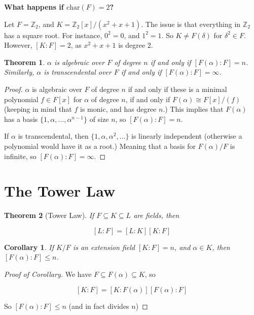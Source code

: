 \documentclass[12pt]{article}
\def\char{\text{char}}
\def\Z{{\mathbb Z}}
\newtheorem{theorem}{Theorem}
\newtheorem{corollary}{Corollary}
\theoremstyle{remark}
\theoremstyle{remark}
\theoremstyle{remark}
\theoremstyle{remark}
\theoremstyle{remark}
\begin{document}
{\bf What happens if $\char(F) = 2$?}

Let $F = \Z_2$, and $K = \Z_2[x] / (x^2 + x + 1)$. The issue is that everything
in $\Z_2$ has a square root. For instance, $0^2 = 0$, and $1^2 = 1$. So $K \ne
F(\delta)$ for $\delta^2 \in F$. However, $[K : F] = 2$, as $x^2 + x + 1$ is
degree $2$.

\begin{theorem}
  $\alpha$ is algebraic over $F$ of degree $n$ if and only if $[F(\alpha) : F] =
  n$. Similarly, $\alpha$ is transcendental over $F$ if and only if $[F(\alpha)
  : F] = \infty$.
\end{theorem}

\begin{proof}
  $\alpha$ is algebraic over $F$ of degree $n$ if and only if these is a minimal
  polynomial $f \in F[x]$ for $\alpha$ of degree $n$, if and only if $F(\alpha)
  \cong F[x] / (f)$ (keeping in mind that $f$ is monic, and has degree $n$.)
  This implies that $F(\alpha)$ has a basis $\{1, \alpha, \dots, \alpha^{n -
  1}\}$ of size $n$, so $[F(\alpha) : F] = n$.

  If $\alpha$ is transcendental, then $\{1, \alpha, \alpha^2, \dots\}$ is
  linearly independent (otherwise a polynomial would have it as a root.) Meaning
  that a basis for $F(\alpha) / F$ is infinite, so $[F(\alpha) : F] = \infty$.
\end{proof}

\section{The Tower Law}

\begin{theorem}[Tower Law]
  If $F \subseteq K \subseteq L$ are fields, then 

  \[
    [L : F] = [L : K][K : F]
  \]
\end{theorem}

\begin{corollary}
  If $K / F$ is an extension field $[K : F] = n$, and $\alpha \in K$, then
  $[F(\alpha) : F] \le n$.
\end{corollary}

\begin{proof}[Proof of Corollary]
  We have $F \subseteq F(\alpha) \subseteq K$, so

  \[
    [K : F] = [K : F(\alpha)][F(\alpha) : F]
  \]

  So $[F(\alpha) : F] \le n$ (and in fact divides $n$)
\end{proof}
\end{document}
